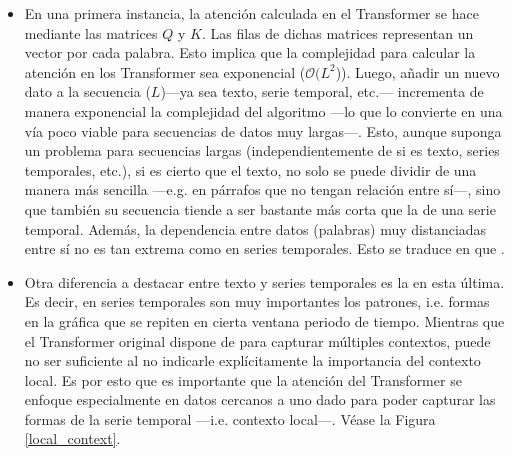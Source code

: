 {\begin{itemize}
    \item En una primera instancia, la atención calculada en el Transformer se hace mediante las matrices $Q$ y $K$. Las filas de dichas matrices representan un vector por cada palabra. Esto implica que la complejidad  para  calcular la atención en los Transformer sea exponencial ($\mathcal{O}(L^2$)). Luego, añadir un nuevo dato a la secuencia ($L$)---ya sea texto, serie temporal, etc.--- incrementa de manera exponencial la complejidad del algoritmo ---lo que lo convierte en una vía poco viable para secuencias de  datos muy largas---. Esto, aunque suponga un problema para secuencias largas (independientemente de si es texto, series temporales, etc.), si es cierto que el texto, no solo se puede dividir de una manera más sencilla ---e.g. en párrafos que no tengan relación entre sí---, sino que también su secuencia tiende a ser bastante más corta que la de una serie temporal\fnm. Además, la dependencia entre datos (palabras) muy distanciadas entre sí no es tan extrema como en series temporales. Esto se traduce en que  \parencite{surveyTransfTS}.
    \addtocounter{footnote}{1}
    \item Otra diferencia a destacar entre texto y series temporales es la  en esta última. Es decir, en series temporales son muy importantes los patrones, i.e. formas en la gráfica que se repiten en cierta ventana periodo de tiempo. Mientras que el Transformer original dispone de  para capturar múltiples contextos, puede no ser suficiente al no indicarle explícitamente la importancia del contexto local. Es por esto que es importante que la atención del Transformer se enfoque especialmente en datos cercanos a uno dado para poder capturar las formas de la serie temporal ---i.e. contexto local---. Véase la Figura \ref{local_context}.
    \begin{figure}[H]
        \centering

\end{figure}
\end{itemize}}
